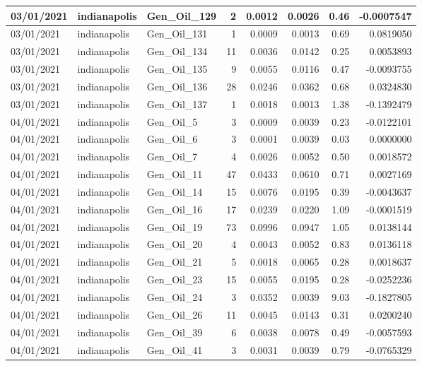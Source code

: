 \documentclass[
  letterpaper,
  DIV=11,
  numbers=noendperiod]{scrartcl}
\begin{document}
\begin{tabular}{l|l|l|r|r|r|r|r}
\hline
03/01/2021 & indianapolis & Gen\_Oil\_129 & 2 & 0.0012 & 0.0026 & 0.46 & -0.0007547\\
\hline
03/01/2021 & indianapolis & Gen\_Oil\_131 & 1 & 0.0009 & 0.0013 & 0.69 & 0.0819050\\
\hline
03/01/2021 & indianapolis & Gen\_Oil\_134 & 11 & 0.0036 & 0.0142 & 0.25 & 0.0053893\\
\hline
03/01/2021 & indianapolis & Gen\_Oil\_135 & 9 & 0.0055 & 0.0116 & 0.47 & -0.0093755\\
\hline
03/01/2021 & indianapolis & Gen\_Oil\_136 & 28 & 0.0246 & 0.0362 & 0.68 & 0.0324830\\
\hline
03/01/2021 & indianapolis & Gen\_Oil\_137 & 1 & 0.0018 & 0.0013 & 1.38 & -0.1392479\\
\hline
04/01/2021 & indianapolis & Gen\_Oil\_5 & 3 & 0.0009 & 0.0039 & 0.23 & -0.0122101\\
\hline
04/01/2021 & indianapolis & Gen\_Oil\_6 & 3 & 0.0001 & 0.0039 & 0.03 & 0.0000000\\
\hline
04/01/2021 & indianapolis & Gen\_Oil\_7 & 4 & 0.0026 & 0.0052 & 0.50 & 0.0018572\\
\hline
04/01/2021 & indianapolis & Gen\_Oil\_11 & 47 & 0.0433 & 0.0610 & 0.71 & 0.0027169\\
\hline
04/01/2021 & indianapolis & Gen\_Oil\_14 & 15 & 0.0076 & 0.0195 & 0.39 & -0.0043637\\
\hline
04/01/2021 & indianapolis & Gen\_Oil\_16 & 17 & 0.0239 & 0.0220 & 1.09 & -0.0001519\\
\hline
04/01/2021 & indianapolis & Gen\_Oil\_19 & 73 & 0.0996 & 0.0947 & 1.05 & 0.0138144\\
\hline
04/01/2021 & indianapolis & Gen\_Oil\_20 & 4 & 0.0043 & 0.0052 & 0.83 & 0.0136118\\
\hline
04/01/2021 & indianapolis & Gen\_Oil\_21 & 5 & 0.0018 & 0.0065 & 0.28 & 0.0018637\\
\hline
04/01/2021 & indianapolis & Gen\_Oil\_23 & 15 & 0.0055 & 0.0195 & 0.28 & -0.0252236\\
\hline
04/01/2021 & indianapolis & Gen\_Oil\_24 & 3 & 0.0352 & 0.0039 & 9.03 & -0.1827805\\
\hline
04/01/2021 & indianapolis & Gen\_Oil\_26 & 11 & 0.0045 & 0.0143 & 0.31 & 0.0200240\\
\hline
04/01/2021 & indianapolis & Gen\_Oil\_39 & 6 & 0.0038 & 0.0078 & 0.49 & -0.0057593\\
\hline
04/01/2021 & indianapolis & Gen\_Oil\_41 & 3 & 0.0031 & 0.0039 & 0.79 & -0.0765329\\

\end{tabular}
\end{document}
